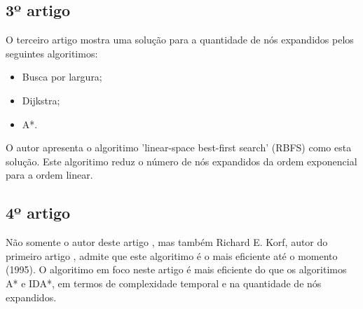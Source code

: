 \documentclass[a4paper]{article}
\begin{document}
\subsection{3º artigo}

O terceiro artigo \cite{Korf1993} mostra uma solução para a quantidade de nós expandidos pelos
seguintes algoritimos:

\begin{itemize}

\item Busca por largura;
\item Dijkstra;
\item A*.

\end{itemize}

O autor apresenta o algoritimo 'linear-space best-first search' (RBFS) como esta solução. Este algoritimo reduz o número de nós expandidos da ordem exponencial para a ordem linear.

\subsection{4º artigo}

Não somente o autor deste artigo \cite{Dillenburg1994}, mas também Richard E. Korf, autor do primeiro artigo \cite{Korf1995}, admite que este algoritimo é o mais eficiente até o momento (1995). O algoritimo em foco neste artigo é mais eficiente do que os algoritimos A* e IDA*, em termos de complexidade temporal e na quantidade de nós expandidos.




\end{document}
